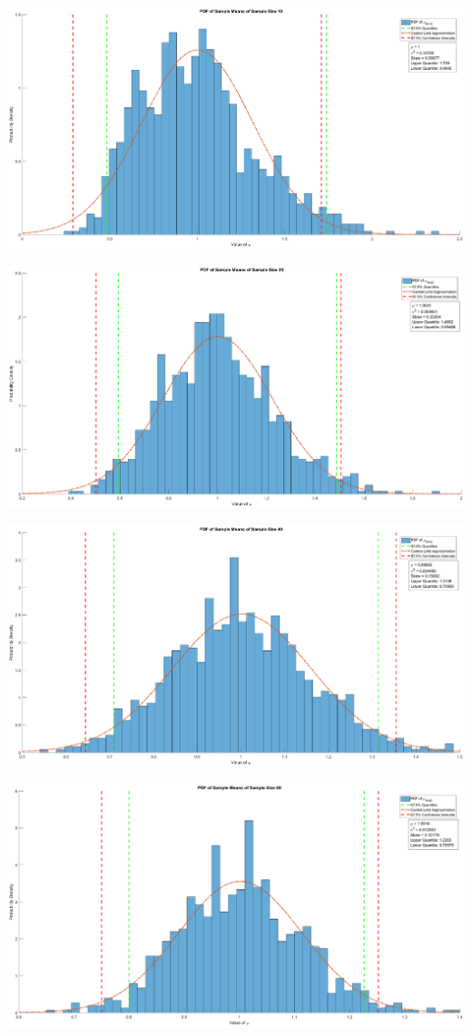 \documentclass[12pt]{article}
\begin{document}
\includegraphics [width=\textwidth]{prob4_02.eps}

\includegraphics [width=\textwidth]{prob4_03.eps}

\includegraphics [width=\textwidth]{prob4_04.eps}

\includegraphics [width=\textwidth]{prob4_05.eps}
\end{document}

